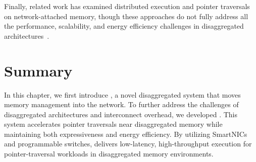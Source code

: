 Finally, related work has examined distributed execution and pointer traversals on network-attached memory, though these approaches do not fully address all the performance, scalability, and energy efficiency challenges in disaggregated architectures~\cite{storagefunctions, splinter, aifm, kayak_nsdi_21, walkers, clio, strom, sun2023demystifying}.


\section{Summary}
\label{sec:future}

In this chapter, we first introduce \mind, a novel disaggregated system that moves memory management into the network. To further address the challenges of disaggregated architectures and interconnect overhead, we developed \pulse. This system accelerates pointer traversals near disaggregated memory while maintaining both expressiveness and energy efficiency. By utilizing SmartNICs and programmable switches, \pulse delivers low-latency, high-throughput execution for pointer-traversal workloads in disaggregated memory environments.



